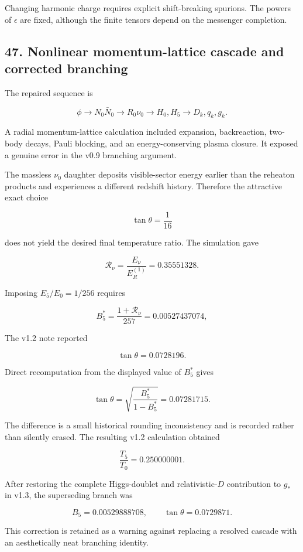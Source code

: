 \documentclass[
]{article}
\begin{document}
Changing harmonic charge requires explicit shift-breaking spurions. The
powers of \(\epsilon\) are fixed, although the finite tensors depend on
the messenger completion.

\hypertarget{nonlinear-momentum-lattice-cascade-and-corrected-branching}{%
\subsection{47. Nonlinear momentum-lattice cascade and corrected
branching}\label{nonlinear-momentum-lattice-cascade-and-corrected-branching}}

The repaired sequence is

\[
\phi\rightarrow N_0\bar N_0
\rightarrow R_0\nu_0
\rightarrow H_0,H_5
\rightarrow D_k,q_k,g_k.
\]

A radial momentum-lattice calculation included expansion, backreaction,
two-body decays, Pauli blocking, and an energy-conserving plasma
closure. It exposed a genuine error in the v0.9 branching argument.

The massless \(\nu_0\) daughter deposits visible-sector energy earlier
than the reheaton products and experiences a different redshift history.
Therefore the attractive exact choice

\[
\tan\theta=\frac1{16}
\]

does not yield the desired final temperature ratio. The simulation gave

\[
\mathcal R_\nu
=\frac{E_\nu}{E_R^{(1)}}
=0.35551328.
\]

Imposing \(E_5/E_0=1/256\) requires

\[
\boxed{
B_5^*=\frac{1+\mathcal R_\nu}{257}
=0.00527437074,
}
\]

The v1.2 note reported

\[
\tan\theta=0.0728196.
\]

Direct recomputation from the displayed value of \(B_5^*\) gives

\[
\tan\theta
=\sqrt{\frac{B_5^*}{1-B_5^*}}
=0.07281715.
\]

The difference is a small historical rounding inconsistency and is
recorded rather than silently erased. The resulting v1.2 calculation
obtained

\[
\frac{T_5}{T_0}=0.250000001.
\]

After restoring the complete Higgs-doublet and relativistic-\(D\)
contribution to \(g_*\) in v1.3, the superseding branch was

\[
B_5=0.00529888708,
\qquad
\tan\theta=0.0729871.
\]

This correction is retained as a warning against replacing a resolved
cascade with an aesthetically neat branching identity.
\end{document}

